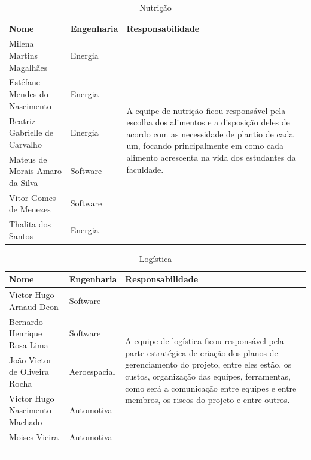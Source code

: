 \begin{anexosenv}
  \begin{table}[!htb]
    \centering
    \begin{tabular}{p{7cm}p{}p{}}
      \toprule
        \textbf{Nome} & \textbf{Engenharia} & \textbf{Responsabilidade} \\
      \midrule
        Milena Martins Magalhães        & Energia  & \multirow{8}{6,5cm}{A equipe de nutrição ficou responsável pela escolha dos alimentos
                                                     e a disposição deles de acordo com as necessidade de plantio de cada um, focando
                                                     principalmente em como cada alimento acrescenta na vida dos estudantes da faculdade.} \\ \cmidrule(r){1-2}
        Estéfane Mendes do Nascimento   & Energia  & \\ \cmidrule(r){1-2}
        Beatriz Gabrielle de Carvalho   & Energia  & \\ \cmidrule(r){1-2}
        Mateus de Morais Amaro da Silva & Software & \\ \cmidrule(r){1-2}
        Vitor Gomes de Menezes          & Software & \\ \cmidrule(r){1-2}
        Thalita dos Santos              & Energia  & \\
      \bottomrule
    \end{tabular}
    \caption{Nutrição}
  \end{table}

  \begin{table}[!htb]
    \centering
    \begin{tabular}{p{7cm}p{}p{}}
      \toprule
        \textbf{Nome} & \textbf{Engenharia} & \textbf{Responsabilidade} \\
      \midrule
        Victor Hugo Arnaud Deon         & Software      & \multirow{8}{6,5cm}{A equipe de logística ficou responsável pela parte estratégica
                                                          de criação dos planos de gerenciamento do projeto, entre eles estão, os custos,
                                                          organização das equipes, ferramentas, como será a comunicação entre equipes e
                                                          entre membros, os riscos do projeto e entre outros.} \\ \cmidrule(r){1-2}
        Bernardo Henrique Rosa Lima     & Software      & \\ \cmidrule(r){1-2}
        João Victor de Oliveira Rocha   & Aeroespacial  & \\ \cmidrule(r){1-2}
        Victor Hugo Nascimento Machado  & Automotiva    & \\ \cmidrule(r){1-2}
        Moises Vieira                   & Automotiva    & \\ \\ \\ \\
      \bottomrule
    \end{tabular}
    \caption{Logística}
  \end{table}


\end{anexosenv}
